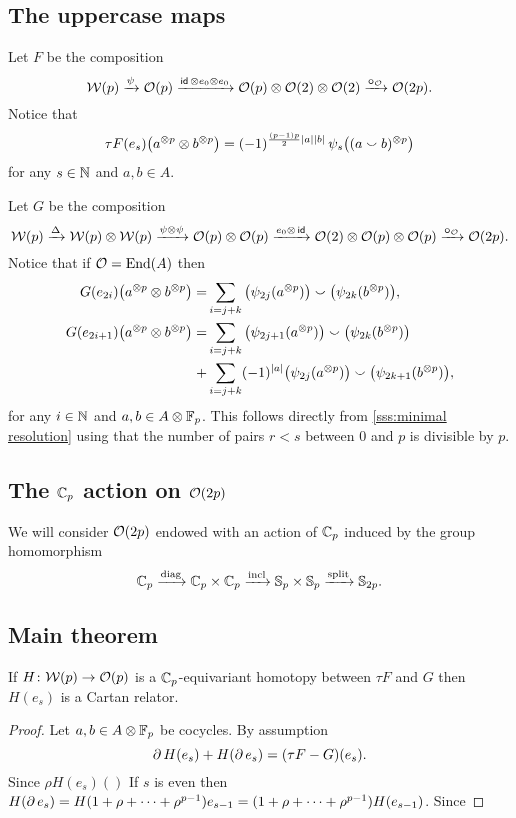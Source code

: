 \subsection{The uppercase maps}\label{ss:main maps}

\sssec

Let $F$ be the composition
\[
\mathcal{W}(p) \xrightarrow{\psi} \mathcal{O}(p) \xrightarrow{\mathsf{id}\, \otimes e_0 \otimes e_0} \mathcal{O}(p) \otimes \mathcal{O}(2) \otimes \mathcal{O}(2) \xrightarrow{\bm{\circ}_{\mathcal{O}}} \mathcal{O}(2p).
\]
Notice that
\[
\tau F(e_s)\big(a^{\otimes p} \otimes b^{\otimes p}\big) =
(-1)^{\frac{(p-1)p}{2}\lvert a\rvert\lvert b\rvert} \, \psi_{s}\big((a \smallsmile b)^{\otimes p}\big)
\]
for any $s \in \mathbb{N}$ and $a,b \in A$.

\sssec

Let $G$ be the composition
\[
\mathcal{W}(p) \xrightarrow{\Delta}
\mathcal{W}(p) \otimes \mathcal{W}(p) \xrightarrow{\psi \otimes \psi}
\mathcal{O}(p) \otimes \mathcal{O}(p) \xrightarrow{e_0 \otimes\, \mathsf{id}}
\mathcal{O}(2) \otimes \mathcal{O}(p) \otimes \mathcal{O}(p) \xrightarrow{\bm{\circ}_{\mathcal{O}}}
\mathcal{O}(2p).
\]
Notice that if $\mathcal{O} = \mathrm{End}(A)$ then
\begin{equation*}
	\begin{split}
		G(e_{2i})\big(a^{\otimes p} \otimes b^{\otimes p}\big) =&
		\sum_{i=j+k}\big(\psi_{2j}(a^{\otimes p})\big) \smallsmile \big(\psi_{2k}(b^{\otimes p})\big), \\
		G(e_{2i+1})\big(a^{\otimes p} \otimes b^{\otimes p}\big) =&
		\sum_{i=j+k} \big(\psi_{2j+1}(a^{\otimes p})\big) \smallsmile \big(\psi_{2k}(b^{\otimes p})\big) \\ \ +&
		\sum_{i=j+k} (-1)^{\lvert a\rvert} \big(\psi_{2j}(a^{\otimes p})\big) \smallsmile \big(\psi_{2k+1}(b^{\otimes p})\big),
	\end{split}
\end{equation*}
for any $i \in \mathbb{N}$ and $a,b \in A \otimes {\mathbb{F}_p}$.
This follows directly from \cref{sss:minimal resolution} using that the number of pairs $r<s$ between $0$ and $p$ is divisible by $p$.

\subsection{The $\mathbb{C}_p$ action on $\mathcal{O}(2p)$}\label{ss:cyclic action}

We will consider $\mathcal{O}(2p)$ endowed with an action of $\mathbb{C}_p$ induced by the group homomorphism
\[
\mathbb{C}_p \xrightarrow{\mathrm{diag}} \mathbb{C}_p \times \mathbb{C}_p \xrightarrow{\mathrm{incl}} \mathbb{S}_p \times \mathbb{S}_p \xrightarrow{\mathrm{split}} \mathbb{S}_{2p}.
\]

\subsection{Main theorem}

If $H \colon \mathcal{W}(p) \to \mathcal{O}(p)$ is a $\mathbb{C}_p$-equivariant homotopy between $\tau F$ and $G$ then
$H(e_s)$ is a Cartan relator.

\begin{proof}
	Let $a, b \in A \otimes {\mathbb{F}_p}$ be cocycles.
	By assumption
	\[
	\operatorname{\partial} H(e_s) + H(\operatorname{\partial} e_s) = (\tau F - G)(e_s).
	\]
	Since $\rho H(e_s)()$
	If $s$ is even then $H(\operatorname{\partial} e_s) = H(1+\rho+\dots+\rho^{p-1})e_{s-1} = (1+\rho+\dots+\rho^{p-1})H(e_{s-1})$.
	Since
\end{proof}